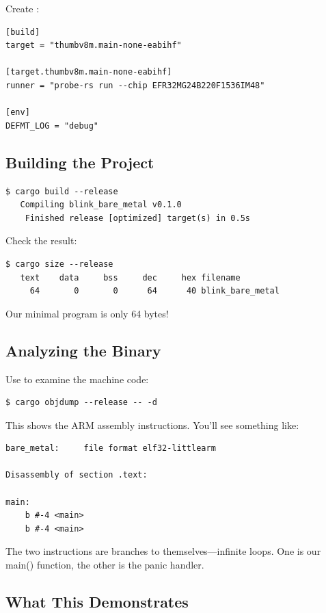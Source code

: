 Create :

\begin{verbatim}
[build]
target = "thumbv8m.main-none-eabihf"

[target.thumbv8m.main-none-eabihf]
runner = "probe-rs run --chip EFR32MG24B220F1536IM48"

[env]
DEFMT_LOG = "debug"
\end{verbatim}

\subsection{Building the Project}

\begin{verbatim}
$ cargo build --release
   Compiling blink_bare_metal v0.1.0
    Finished release [optimized] target(s) in 0.5s
\end{verbatim}

Check the result:

\begin{verbatim}
$ cargo size --release
   text    data     bss     dec     hex filename
     64       0       0      64      40 blink_bare_metal
\end{verbatim}

Our minimal program is only 64 bytes!

\subsection{Analyzing the Binary}

Use  to examine the machine code:

\begin{verbatim}
$ cargo objdump --release -- -d
\end{verbatim}

This shows the ARM assembly instructions. You'll see something like:

\begin{verbatim}
bare_metal:     file format elf32-littlearm

Disassembly of section .text:

main:
    b #-4 <main>
    b #-4 <main>
\end{verbatim}

The two  instructions are branches to themselves---infinite loops. One is our main() function, the other is the panic handler.

\subsection{What This Demonstrates}


